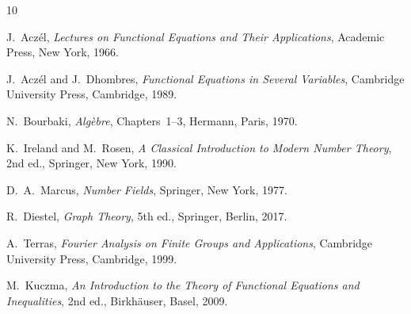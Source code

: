 \documentclass[11pt,reqno]{amsart}
\theoremstyle{plain}
\theoremstyle{definition}
\theoremstyle{remark}
\newcommand{\1}{\mathbf{1}}
\begin{document}
\begin{thebibliography}{10}

J.~Acz\'el,
\emph{Lectures on Functional Equations and Their Applications},
Academic Press, New York, 1966.

J.~Acz\'el and J.~Dhombres,
\emph{Functional Equations in Several Variables},
Cambridge University Press, Cambridge, 1989.

N.~Bourbaki,
\emph{Alg\`ebre}, Chapters~1--3,
Hermann, Paris, 1970.

K.~Ireland and M.~Rosen,
\emph{A Classical Introduction to Modern Number Theory},
2nd ed., Springer, New York, 1990.

D.~A.~Marcus,
\emph{Number Fields},
Springer, New York, 1977.

R.~Diestel,
\emph{Graph Theory},
5th ed., Springer, Berlin, 2017.

A.~Terras,
\emph{Fourier Analysis on Finite Groups and Applications},
Cambridge University Press, Cambridge, 1999.

M.~Kuczma,
\emph{An Introduction to the Theory of Functional Equations and Inequalities},
2nd ed., Birkh\"auser, Basel, 2009.

\end{thebibliography}
\end{document}

